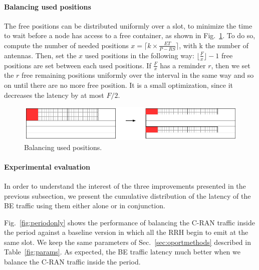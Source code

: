 \documentclass[10pt, conference, letterpaper]{IEEEtran}
\begin{document}
\paragraph{Balancing used positions}

The free positions can be distributed uniformly over a slot, to minimize the time to wait before a node 
has access to a free container, as shown in Fig.~\ref{fig:slotbal}. To do so, compute the number of needed positions $x = \lceil k\times \frac{ET}{P - RS}\rceil$, with k the number of antennas. Then, set the $x$ used positions in the following way: $\lfloor\frac{F}{x}\rfloor -1 $ free positions are set between each used positions. If $\frac{F}{x}$ has a reminder $r$, then we set the $r$ free remaining positions uniformly over the interval in the same way and so on until there are no more free position. It is a small optimization, since it decreases the latency by at most $F/2$.

\begin{figure}[h!]
\begin{center}   

      \includegraphics[scale=0.55]{repart1}
     \caption{Balancing used positions.}\label{fig:slotbal}
     
\end{center}
  \end{figure}

  \paragraph{Experimental evaluation}

  In order to understand the interest of the three improvements presented in the previous subsection,
   we present the cumulative distribution of the latency of the BE traffic using them either alone or in conjunction.
   
Fig.~\ref{fig:periodonly} shows the performance of balancing the C-RAN traffic inside the period against a baseline version in which all the RRH begin to emit at the same slot. We keep the same parameters of Sec.~\ref{sec:oportmethods} described in Table~\ref{fig:params}. As expected, the BE traffic latency much better when we balance the C-RAN traffic inside the period.
\end{document}
